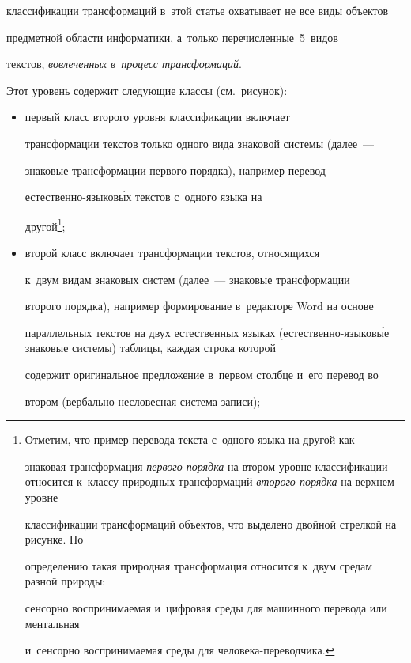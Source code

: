 классификации трансформаций в~этой статье охватывает не все виды объектов 

предметной об\-ласти информатики, а~только перечисленные~5~видов 

текстов, \textit{вовлеченных в~процесс трансформаций}.


Этот уровень содержит следующие классы (см.\ рисунок):

\begin{itemize}

\item  первый класс второго уровня классификации включает 

трансформации текс\-тов только одного вида знаковой системы (далее~--- 

знаковые трансформации первого порядка), например перевод  

ес\-тест\-вен\-но-язы\-ко\-в\'{ы}х текстов с~одного языка на 

другой\footnote[3]{Отметим, что пример перевода текста с~одного языка на другой как 

знаковая трансформация \textit{первого порядка} на втором уровне классификации относится к~классу природных трансформаций \textit{второго порядка} на верхнем уровне 

классификации трансформаций объектов, что выделено двойной стрелкой на рисунке. По 

определению такая природная трансформация относится к~двум средам разной природы: 

сенсорно воспринимаемая и~цифровая среды для машинного перевода или ментальная 

и~сенсорно воспринимаемая среды для че\-ло\-ве\-ка-пе\-ре\-вод\-чика.};

\item  второй класс включает трансформации текстов, относящихся 

к~двум видам знаковых сис\-тем (далее~--- знаковые трансформации 

второго порядка), например формирование в~редакторе Word на основе 

параллельных текстов на двух естественных языках (естественно-языков\'{ы}е знаковые системы) таб\-ли\-цы, каждая строка которой 

содержит оригинальное предложение в~первом столбце и~его перевод во 

втором (вер\-баль\-но-не\-сло\-вес\-ная сис\-те\-ма записи);\\[-13pt]


\end{itemize}
